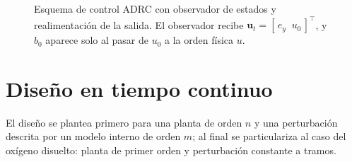 \begin{figure}[H]
{%
  }
  \caption{Esquema de control ADRC con observador de estados y realimentación de la salida. El
    observador recibe $\mathbf{u}_t = [\,e_y \;\; u_0\,]^{\top}$, y $b_0$ aparece solo al
    pasar de $u_0$ a la orden física $u$.}
  \label{fig:adrc}
\end{figure}
\section{Diseño en tiempo continuo}
\label{sec:ContinuosTime}

El diseño se plantea primero para una planta de orden $n$ y una perturbación
descrita por un modelo interno de orden $m$; al final se particulariza al caso
del oxígeno disuelto: planta de primer orden y perturbación constante a tramos.

